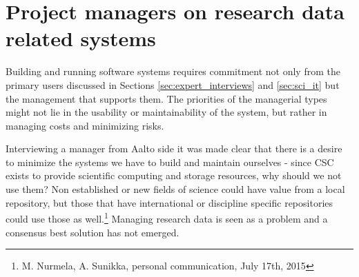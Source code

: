 \section{Project managers on research data related systems}

Building and running software systems requires commitment not only from the
primary users discussed in Sections \ref{sec:expert_interviews} and
\ref{sec:sci_it} but the management that supports them. The priorities of the
managerial types might not lie in the usability or maintainability of the
system, but rather in managing costs and minimizing risks.

Interviewing a manager from Aalto side it was made clear that there is a
desire to minimize the systems we have to build and
maintain ourselves - since CSC exists to provide scientific computing and
storage resources, why should we not use them? Non established or new fields
of science could have value from a local repository, but those that have
international or discipline specific repositories could use those as well.\footnote{M. Nurmela, A. Sunikka, personal communication, July 17th, 2015}
Managing research data is seen as a problem and a consensus best solution has not
emerged.

